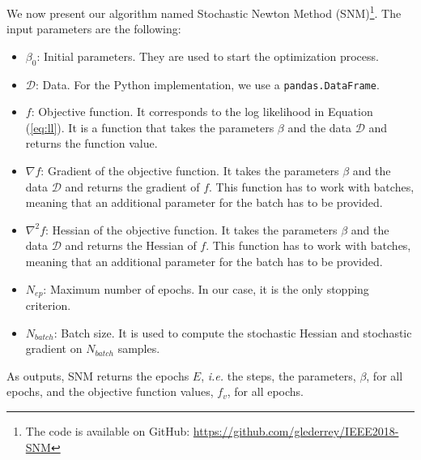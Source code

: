\documentclass[conference]{IEEEtran}
\begin{document}
We now present our algorithm named Stochastic Newton Method (SNM)\footnote{The code is available on GitHub: \href{https://github.com/glederrey/IEEE2018-SNM}{https://github.com/glederrey/IEEE2018-SNM}}. The input parameters are the following:
\begin{itemize}
\item $\beta_0$: Initial parameters. They are used to start the optimization process.
\item $\mathcal{D}$: Data. For the Python implementation, we use a \texttt{pandas.DataFrame}.
\item $f$: Objective function. It corresponds to the log likelihood in Equation (\ref{eq:ll}). It is a function that takes the parameters $\beta$ and the data $\mathcal{D}$ and returns the function value.
\item $\nabla f$: Gradient of the objective function. It takes the parameters $\beta$ and the data $\mathcal{D}$ and returns the gradient of $f$. This function has to work with batches, meaning that an additional parameter for the batch has to be provided.
\item $\nabla^2 f$: Hessian of the objective function. It takes the parameters $\beta$ and the data $\mathcal{D}$ and returns the Hessian of $f$. This function has to work with batches, meaning that an additional parameter for the batch has to be provided.
\item $N_{ep}$: Maximum number of epochs. In our case, it is the only stopping criterion.
\item $N_{batch}$: Batch size. It is used to compute the stochastic Hessian and stochastic gradient on $N_{batch}$ samples.
\end{itemize}
As outputs, SNM returns the epochs $E$, {\it i.e.} the steps, the parameters, $\beta$, for all epochs, and the objective function values, $f_v$, for all epochs. 
\end{document}
